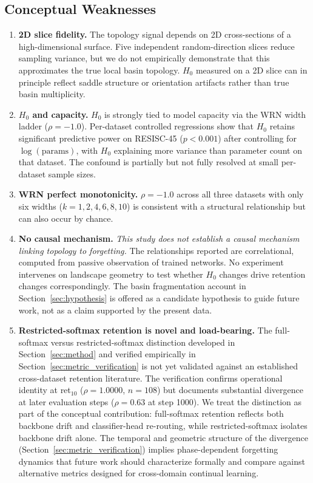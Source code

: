 \documentclass[10pt,twocolumn]{article}
\begin{document}
\subsection{Conceptual Weaknesses}
\begin{enumerate}
    \item \textbf{2D slice fidelity.} The topology signal depends on 2D cross-sections of a high-dimensional surface. Five independent random-direction slices reduce sampling variance, but we do not empirically demonstrate that this approximates the true local basin topology. $H_0$ measured on a 2D slice can in principle reflect saddle structure or orientation artifacts rather than true basin multiplicity.
    \item \textbf{$H_0$ and capacity.} $H_0$ is strongly tied to model capacity via the WRN width ladder ($\rho = -1.0$). Per-dataset controlled regressions show that $H_0$ retains significant predictive power on RESISC-45 ($p < 0.001$) after controlling for $\log(\text{params})$, with $H_0$ explaining more variance than parameter count on that dataset. The confound is partially but not fully resolved at small per-dataset sample sizes.
    \item \textbf{WRN perfect monotonicity.} $\rho = -1.0$ across all three datasets with only six widths ($k = 1, 2, 4, 6, 8, 10$) is consistent with a structural relationship but can also occur by chance.
    \item \textbf{No causal mechanism.} \emph{This study does not establish a causal mechanism linking topology to forgetting.} The relationships reported are correlational, computed from passive observation of trained networks. No experiment intervenes on landscape geometry to test whether $H_0$ changes drive retention changes correspondingly. The basin fragmentation account in Section~\ref{sec:hypothesis} is offered as a candidate hypothesis to guide future work, not as a claim supported by the present data.
    \item \textbf{Restricted-softmax retention is novel and load-bearing.} The full-softmax versus restricted-softmax distinction developed in Section~\ref{sec:method} and verified empirically in Section~\ref{sec:metric_verification} is not yet validated against an established cross-dataset retention literature. The verification confirms operational identity at ret$_{10}$ ($\rho = 1.0000$, $n = 108$) but documents substantial divergence at later evaluation steps ($\rho = 0.63$ at step 1000). We treat the distinction as part of the conceptual contribution: full-softmax retention reflects both backbone drift and classifier-head re-routing, while restricted-softmax isolates backbone drift alone. The temporal and geometric structure of the divergence (Section~\ref{sec:metric_verification}) implies phase-dependent forgetting dynamics that future work should characterize formally and compare against alternative metrics designed for cross-domain continual learning.
\end{enumerate}
\end{document}
